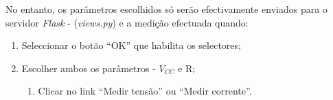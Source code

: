 No entanto, os parâmetros escolhidos só serão efectivamente enviados para o servidor \textit{Flask} - (\textit{views.py}) e a medição efectuada quando:
\begin{enumerate}
	\item Seleccionar o botão ``OK'' que habilita os selectores;
	\item Escolher ambos os parâmetros - $V_{CC}$ e R;
	\begin{enumerate}
		\item Clicar no link ``Medir tensão'' ou ``Medir corrente''.
	\end{enumerate}
\end{enumerate}

